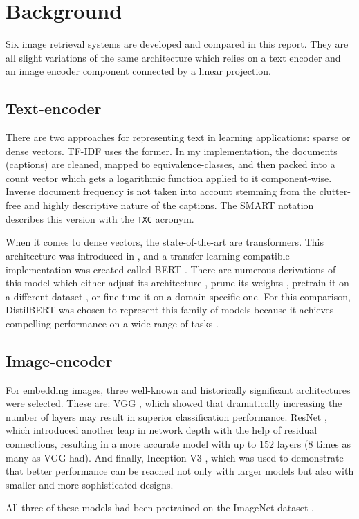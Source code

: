 \section{Background}

Six image retrieval systems are developed and compared in this report. They are all slight variations of the same architecture which relies on a text encoder and an image encoder component connected by a linear projection.

\subsection{Text-encoder}

There are two approaches for representing text in learning applications: sparse or dense vectors. TF-IDF uses the former. In my implementation, the documents (captions) are cleaned, mapped to equivalence-classes, and then packed into a count vector which gets a logarithmic function applied to it component-wise. Inverse document frequency is not taken into account stemming from the clutter-free and highly descriptive nature of the captions. The SMART notation \cite{buckley1985implementation} describes this version with the \texttt{TXC} acronym.

When it comes to dense vectors, the state-of-the-art are transformers. This architecture was introduced in \cite{vaswani2017attention}, and a transfer-learning-compatible implementation was created called BERT \cite{devlin2018bert}. There are numerous derivations of this model which either adjust its architecture \cite{sanh2019distilbert}, prune its weights \cite{de2020optimal}, pretrain it on a different dataset \cite{beltagy2019scibert}, or fine-tune it on a domain-specific one. For this comparison, DistilBERT was chosen to represent this family of models because it achieves compelling performance on a wide range of tasks \cite{sanh2019distilbert}.

\subsection{Image-encoder}

For embedding images, three well-known and historically significant architectures were selected. These are: VGG \cite{simonyan2014very}, which showed that dramatically increasing the number of layers may result in superior classification performance. ResNet \cite{he2016deep}, which introduced another leap in network depth with the help of residual connections, resulting in a more accurate model with up to 152 layers (8 times as many as VGG had). And finally, Inception V3 \cite{szegedy2016rethinking}, which was used to demonstrate that better performance can be reached not only with larger models but also with smaller and more sophisticated designs.

All three of these models had been pretrained on the ImageNet dataset \cite{deng2009imagenet}.
